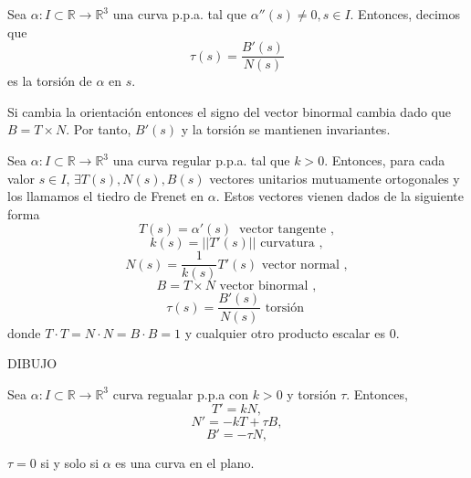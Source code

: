 \begin{defn}[Torsión]
  Sea $\alpha  : I \subset \mathbb{R} \to \mathbb{R}^{3}$ una curva p.p.a. tal que $\alpha''(s) \neq 0, s \in I$. Entonces, decimos que
  \[
    \tau(s) = \frac{B'(s)}{N(s)}
  \]
  es la torsión de $\alpha$ en $s$.
\end{defn}

\begin{obs}
  Si cambia la orientación entonces el signo del vector binormal cambia dado que $B = T \times N$. Por tanto, $B'(s)$ y la torsión se mantienen invariantes. 
\end{obs}

\begin{defn}
  Sea $\alpha  : I \subset \mathbb{R} \to \mathbb{R}^{3}$ una curva regular p.p.a. tal que $k>0$. Entonces, para cada valor $s \in I$, $\exists T(s), N(s), B(s)$ vectores unitarios mutuamente ortogonales y los llamamos el tiedro de Frenet en $\alpha$. Estos vectores vienen dados de la siguiente forma
  \[ 
    T(s) = \alpha'(s) \ \text{ vector tangente } ,
  \] 
  \[ 
    k(s) = ||T'(s)||  \text{ curvatura } ,
  \] 
  \[ 
    N(s) = \frac{1}{k(s)}T'(s)  \text{ vector normal } ,
  \]
  \[ 
    B = T \times N  \text{ vector binormal } ,
  \] 
  \[ 
    \tau(s) = \frac{B'(s)}{N(s)}  \text{ torsión } 
  \] 
  donde $T \cdot T = N \cdot N = B \cdot B = 1$ y cualquier otro producto escalar es $0$.
\end{defn}

DIBUJO

\begin{defn}
  Sea $\alpha  : I \subset \mathbb{R} \to \mathbb{R}^{3}$ curva regualar p.p.a con $k>0$ y torsión $\tau$. Entonces, 
  \[ 
    T' = kN, 
  \] 
  \[ 
    N' = -kT + \tau B,
  \] 
  \[ 
    B' = -\tau N,
  \] 
\end{defn}

\begin{prop}
  $\tau = 0$ si y solo si $\alpha$ es una curva en el plano.
\end{prop}

